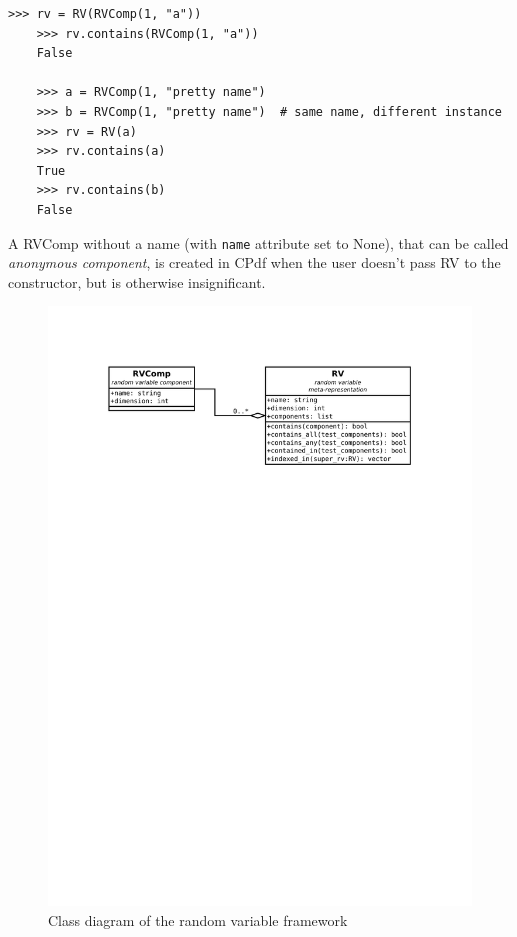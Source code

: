 \begin{Verbatim}[samepage=true,gobble=1,label=RV and RVComp demonstration,frame=single]
	>>> rv = RV(RVComp(1, "a"))
	>>> rv.contains(RVComp(1, "a"))
	False

	>>> a = RVComp(1, "pretty name")
	>>> b = RVComp(1, "pretty name")  # same name, different instance
	>>> rv = RV(a)
	>>> rv.contains(a)
	True
	>>> rv.contains(b)
	False
\end{Verbatim}
A RVComp without a name (with \verb|name| attribute set to None), that can be called \emph{anonymous
component}, is created in CPdf when the user doesn't pass RV to the constructor, but is otherwise
insignificant.

\begin{figure}[ht]
	\centering
	\includegraphics[width=\textwidth,keepaspectratio=true,clip=true,trim=3cm 218mm 3cm 3cm]{./diagrams/rvs.pdf}
	\vspace{-8mm}
	\caption{Class diagram of the random variable framework}
	\label{fig:DiaRvs}
\end{figure}

